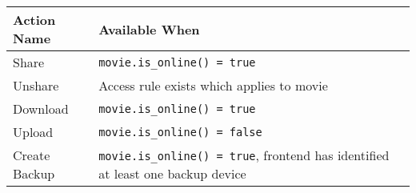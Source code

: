 \begin{tabularx}{\textwidth}{l|X}
\hline
 Action Name   & Available When                               \\
\hline
 Share         & \texttt{movie.is\_online() = true}           \\
 Unshare       & Access rule exists which applies to movie    \\
 Download      & \texttt{movie.is\_online() = true}           \\
 Upload        & \texttt{movie.is\_online() = false}          \\
 Create Backup & \texttt{movie.is\_online() = true}, frontend has identified at least one backup device \\ 
\hline
\end{tabularx}